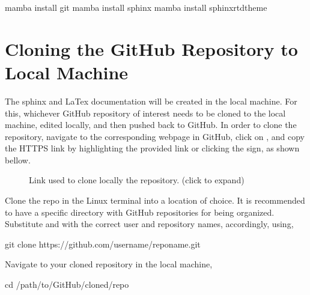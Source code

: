 \documentclass[letterpaper,10pt,english]{sphinxhowto}
\let\sphinxpxdimen\pdfpxdimen\else\newdimen\sphinxpxdimen
\begin{document}
\begin{sphinxVerbatim}[commandchars=\\\{\}]
\PYGZdl{} mamba install git
\PYGZdl{} mamba install sphinx
\PYGZdl{} mamba install sphinx\PYGZus{}rtd\PYGZus{}theme
\end{sphinxVerbatim}


\section{Cloning the GitHub Repository to Local Machine}
\label{\detokenize{index:cloning-the-github-repository-to-local-machine}}
\sphinxAtStartPar
The sphinx and LaTex documentation will be created in the local machine. For this, whichever GitHub repository of interest needs to be cloned to the local machine, edited locally, and then pushed back to GitHub. In order to clone the repository, navigate to the corresponding webpage in GitHub, click on , and copy the HTTPS link by highlighting the provided link or clicking the  sign, as shown bellow.

\begin{figure}[htbp]
\centering
\capstart

\noindent\sphinxincludegraphics[width=600\sphinxpxdimen]{{github_repo_clone}.png}
\caption{Link used to clone locally the repository. (click to expand)}\label{\detokenize{index:id1}}\end{figure}

\sphinxAtStartPar
Clone the repo in the Linux terminal into a location of choice. It is recommended to have a specific directory with GitHub repositories for being organized. Substitute  and  with the correct user and repository names, accordingly, using,

\begin{sphinxVerbatim}[commandchars=\\\{\}]
\PYGZdl{} git clone https://github.com/\PYGZlt{}user\PYGZhy{}name\PYGZgt{}/\PYGZlt{}repo\PYGZhy{}name\PYGZgt{}.git
\end{sphinxVerbatim}

\sphinxAtStartPar
Navigate to your cloned repository in the local machine,

\begin{sphinxVerbatim}[commandchars=\\\{\}]
\PYGZdl{} cd /path/to/GitHub/cloned/repo
\end{sphinxVerbatim}
\end{document}
